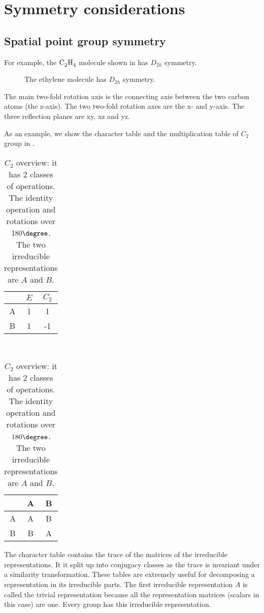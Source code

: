 \section{Symmetry considerations}\label{ch2-sym}

\subsection{Spatial point group symmetry}\label{ch2-pointsym}

For example, the $\ce{C2H4}$ molecule shown in  has $D_{2h}$ symmetry.
\begin{figure}[h]
    \centering
    \caption{The ethylene molecule has $D_{2h}$ symmetry.}
    \label{2-fig4}
\end{figure}
The main two-fold rotation axis is the connecting axis between the two carbon atoms (the z-axis). The two two-fold rotation axes are the x- and y-axis. The three reflection planes are xy, xz and yz.

As an example, we show the character table and the multiplication table of $C_{2}$ group in .
\begin{table}
    \begin{subtable}{.5\linewidth}
        \centering
        \begin{tabular}{c|cc}
            & $E$ & $C_2$ \\
            \hline
            A & 1 & 1 \\
            B & 1 & -1
        \end{tabular}
        \caption{Character table of $C_2$}
        \label{2-tab1a}
    \end{subtable}
    ~
    \begin{subtable}{.5\linewidth}
    \centering
    \begin{tabular}{c|cc}
        & A & B \\
        \hline
        A & A & B \\
        B & B & A 
    \end{tabular}
    \caption{Multiplication table of $C_2$}
    \label{2-tab1b}
    \end{subtable}
    \caption{$C_2$ overview: it has 2 classes of operations. The identity operation and rotations over $180\degree$. The two irreducible representations are $A$ and $B$.}
    \label{2-tab1}
\end{table}
The character table contains the trace of the matrices of the irreducible representations. It it split up into conjugacy classes as the trace is invariant under a similarity transformation. These tables are extremely useful for decomposing a representation in its irreducible parts. The first irreducible representation $A$ is called the trivial representation because all the representation matrices (scalars in this case) are one. Every group has this irreducible representation.

